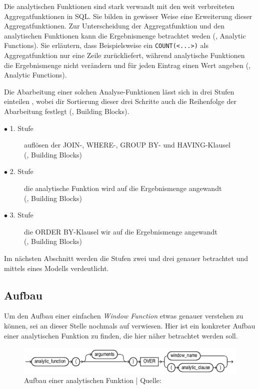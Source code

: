 Die analytischen Funktionen sind stark verwandt mit den weit verbreiteten
Aggregatfunktionen in SQL. Sie bilden in gewisser Weise eine Erweiterung dieser Aggregatfunktionen.
Zur Unterscheidung der Aggregatfunktion und den analytischen Funktionen kann die
Ergebnismenge betrachtet weden (\cite{Nuijten2023}, Analytic Functions). Sie
erläutern, dass Beispielsweise ein \texttt{COUNT(<...>)} als Aggregatfunktion
nur eine Zeile zurückliefert, während analytische Funktionen die Ergebnismenge nicht
verändern und für jeden Eintrag einen Wert angeben (\cite{Nuijten2023}, Analytic
Functions).

Die Abarbeitung einer solchen Analyse-Funktionen lässt sich in drei Stufen
einteilen , wobei dir Sortierung dieser drei Schritte auch die Reihenfolge der
Abarbeitung festlegt (\cite{Nuijten2023}, Building Blocks).
\begin{description}
	\item[$\bullet$ 1. Stufe] auflösen der JOIN-, WHERE-, GROUP BY- und HAVING-Klausel
		\\ (\cite{Nuijten2023}, Building Blocks)

	\item[$\bullet$ 2. Stufe] die analytische Funktion wird auf die Ergebnismenge angewandt
		\\ (\cite{Nuijten2023}, Building Blocks)

	\item[$\bullet$ 3. Stufe] die ORDER BY-Klausel wir auf die Ergebnismenge angewandt
		\\ (\cite{Nuijten2023}, Building Blocks)
\end{description}
Im nächsten Abschnitt werden die Stufen zwei und drei genauer betrachtet und
mittels eines Modells verdeutlicht.

\subsection{Aufbau}
Um den Aufbau einer einfachen \textit{Window Function} etwas genauer verstehen zu
können, sei an dieser Stelle nochmals auf \cite{oracle} verwiesen. Hier ist ein konkreter
Aufbau einer analytischen Funktion zu finden, die hier näher betrachtet werden
soll.

\begin{figure}[h]
	\centering
	\includegraphics[scale=0.5]{img/aufbauAnalyticFunction.jpg}
	\caption{ Aufbau einer analytischen Funktion | Quelle: \cite{oracle}}
\end{figure}


